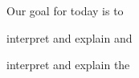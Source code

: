 \documentclass[t]{beamer}
\begin{document}
%

\begin{frame}[t]{Our goal for today is to }

	
	\hangpara interpret and explain  and
	
	\hangpara interpret and explain the 
	
	

\end{frame}

\end{document}
